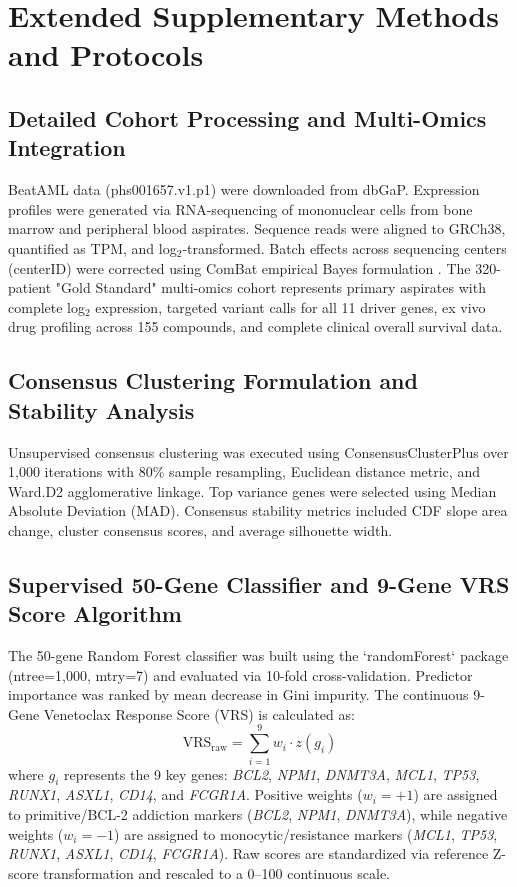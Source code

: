 \documentclass[11pt,a4paper]{article}
\begin{document}
\section{Extended Supplementary Methods and Protocols}

\subsection{Detailed Cohort Processing and Multi-Omics Integration}
BeatAML data (phs001657.v1.p1) were downloaded from dbGaP. Expression profiles were generated via RNA-sequencing of mononuclear cells from bone marrow and peripheral blood aspirates. Sequence reads were aligned to GRCh38, quantified as TPM, and log$_2$-transformed. Batch effects across sequencing centers (centerID) were corrected using ComBat empirical Bayes formulation \cite{johnson2007combat}. The 320-patient "Gold Standard" multi-omics cohort represents primary aspirates with complete log$_2$ expression, targeted variant calls for all 11 driver genes, ex vivo drug profiling across 155 compounds, and complete clinical overall survival data.

\subsection{Consensus Clustering Formulation and Stability Analysis}
Unsupervised consensus clustering was executed using ConsensusClusterPlus \cite{wilkerson2010consensuscluster} over 1,000 iterations with 80\% sample resampling, Euclidean distance metric, and Ward.D2 agglomerative linkage. Top variance genes were selected using Median Absolute Deviation (MAD). Consensus stability metrics included CDF slope area change, cluster consensus scores, and average silhouette width.

\subsection{Supervised 50-Gene Classifier and 9-Gene VRS Score Algorithm}
The 50-gene Random Forest classifier was built using the `randomForest` package (ntree=1,000, mtry=7) and evaluated via 10-fold cross-validation. Predictor importance was ranked by mean decrease in Gini impurity.
The continuous 9-Gene Venetoclax Response Score (VRS) is calculated as:
\begin{equation}
\text{VRS}_{\text{raw}} = \sum_{i=1}^{9} w_i \cdot z(g_i)
\end{equation}
where $g_i$ represents the 9 key genes: \textit{BCL2}, \textit{NPM1}, \textit{DNMT3A}, \textit{MCL1}, \textit{TP53}, \textit{RUNX1}, \textit{ASXL1}, \textit{CD14}, and \textit{FCGR1A}. Positive weights ($w_i = +1$) are assigned to primitive/BCL-2 addiction markers (\textit{BCL2}, \textit{NPM1}, \textit{DNMT3A}), while negative weights ($w_i = -1$) are assigned to monocytic/resistance markers (\textit{MCL1}, \textit{TP53}, \textit{RUNX1}, \textit{ASXL1}, \textit{CD14}, \textit{FCGR1A}). Raw scores are standardized via reference Z-score transformation and rescaled to a 0--100 continuous scale.
\end{document}

